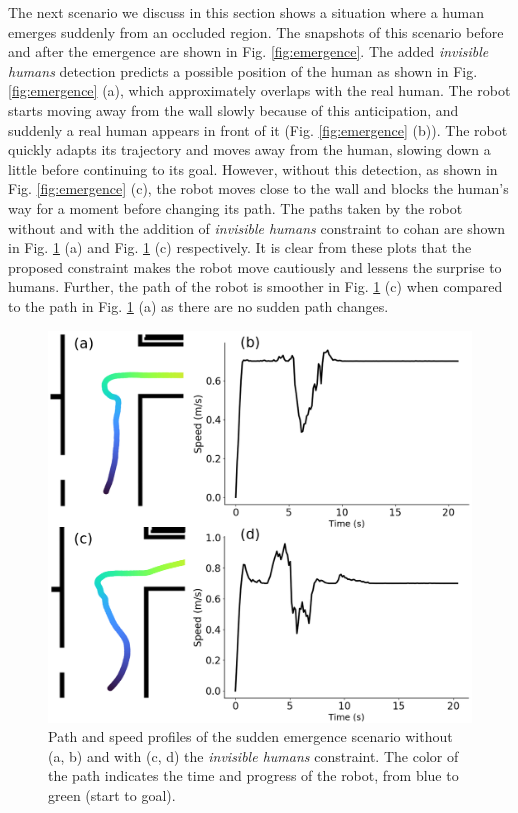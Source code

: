 \noindent The next scenario we discuss in this section shows a situation where a human emerges suddenly from an occluded region. The snapshots of this scenario before and after the emergence are shown in Fig. \ref{fig:emergence}. The added \textit{invisible humans} detection predicts a possible position of the human as shown in Fig. \ref{fig:emergence} (a), which approximately overlaps with the real human. The robot starts moving away from the wall slowly because of this anticipation, and suddenly a real human appears in front of it (Fig. \ref{fig:emergence} (b)). The robot quickly adapts its trajectory and moves away from the human, slowing down a little before continuing to its goal. However, without this detection, as shown in Fig. \ref{fig:emergence} (c), the robot moves close to the wall and blocks the human's way for a moment before changing its path. The paths taken by the robot without and with the addition of \textit{invisible humans} constraint to \acrshort{cohan} are shown in Fig. \ref{fig:appear_plots} (a) and Fig. \ref{fig:appear_plots} (c) respectively. It is clear from these plots that the proposed constraint makes the robot move cautiously and lessens the surprise to humans. Further, the path of the robot is smoother in Fig. \ref{fig:appear_plots} (c) when compared to the path in Fig. \ref{fig:appear_plots} (a) as there are no sudden path changes. 

\begin{figure}[ht!]
\centering
\includegraphics[width=0.8\columnwidth]{images/chapter5/appear_new.png}
\caption{Path and speed profiles of the sudden emergence scenario without (a, b) and with (c, d) the \textit{invisible humans} constraint. The color of the path indicates the time and progress of the robot, from blue to green (start to goal).}
\label{fig:appear_plots}
\end{figure}

